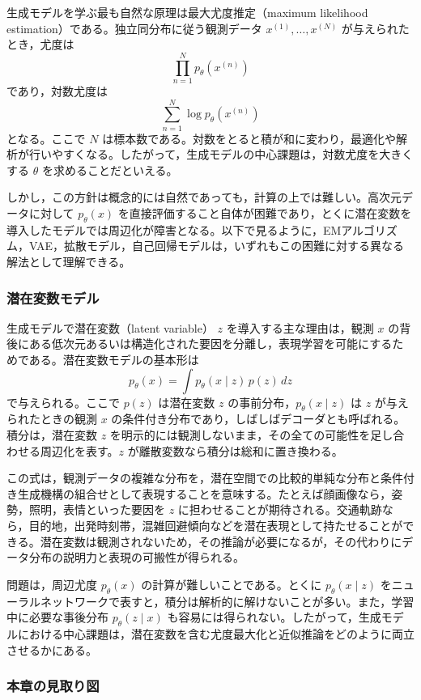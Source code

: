 生成モデルを学ぶ最も自然な原理は最大尤度推定（maximum likelihood estimation）である。独立同分布に従う観測データ \(x^{(1)},\dots,x^{(N)}\) が与えられたとき，尤度は
\[
\prod_{n=1}^{N} p_{\theta}(x^{(n)})
\]
であり，対数尤度は
\[
\sum_{n=1}^{N} \log p_{\theta}(x^{(n)})
\]
となる。ここで \(N\) は標本数である。対数をとると積が和に変わり，最適化や解析が行いやすくなる。したがって，生成モデルの中心課題は，対数尤度を大きくする \(\theta\) を求めることだといえる。

しかし，この方針は概念的には自然であっても，計算の上では難しい。高次元データに対して \(p_{\theta}(x)\) を直接評価すること自体が困難であり，とくに潜在変数を導入したモデルでは周辺化が障害となる。以下で見るように，EMアルゴリズム，VAE，拡散モデル，自己回帰モデルは，いずれもこの困難に対する異なる解法として理解できる。

\subsubsection{潜在変数モデル}

生成モデルで潜在変数（latent variable） \(z\) を導入する主な理由は，観測 \(x\) の背後にある低次元あるいは構造化された要因を分離し，表現学習を可能にするためである。潜在変数モデルの基本形は
\[
p_{\theta}(x) = \int p_{\theta}(x \mid z)\, p(z)\, dz
\]
で与えられる。ここで \(p(z)\) は潜在変数 \(z\) の事前分布，\(p_{\theta}(x \mid z)\) は \(z\) が与えられたときの観測 \(x\) の条件付き分布であり，しばしばデコーダとも呼ばれる。積分は，潜在変数 \(z\) を明示的には観測しないまま，その全ての可能性を足し合わせる周辺化を表す。\(z\) が離散変数なら積分は総和に置き換わる。

この式は，観測データの複雑な分布を，潜在空間での比較的単純な分布と条件付き生成機構の組合せとして表現することを意味する。たとえば顔画像なら，姿勢，照明，表情といった要因を \(z\) に担わせることが期待される。交通軌跡なら，目的地，出発時刻帯，混雑回避傾向などを潜在表現として持たせることができる。潜在変数は観測されないため，その推論が必要になるが，その代わりにデータ分布の説明力と表現の可搬性が得られる。

問題は，周辺尤度 \(p_{\theta}(x)\) の計算が難しいことである。とくに \(p_{\theta}(x \mid z)\) をニューラルネットワークで表すと，積分は解析的に解けないことが多い。また，学習中に必要な事後分布 \(p_{\theta}(z \mid x)\) も容易には得られない。したがって，生成モデルにおける中心課題は，潜在変数を含む尤度最大化と近似推論をどのように両立させるかにある。

\subsubsection{本章の見取り図}

